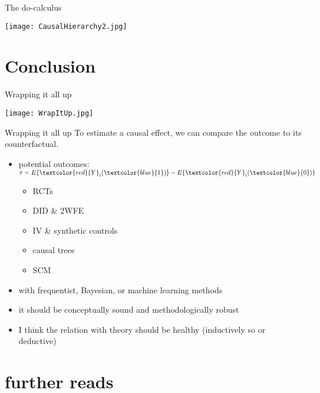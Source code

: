 \documentclass[aspectratio=169]{beamer}
\begin{document}
		\begin{frame}{The do-calculus}
			\begin{center}
				\texttt{[image: CausalHierarchy2.jpg]}
			\end{center}
		\end{frame}

\section{Conclusion}


	\begin{frame}{Wrapping it all up}
		\begin{center}
			\texttt{[image: WrapItUp.jpg]}
		\end{center}
	\end{frame}

	\begin{frame}{Wrapping it all up}
		To estimate a causal effect, we can compare the outcome to its counterfactual.
		\begin{itemize}
			\item<1-> potential outcomes: $ \tau  =  E \{\textcolor{red}{Y}_i(\textcolor{blue}{1})\} - E \{\textcolor{red}{Y}_i(\textcolor{blue}{0})\} $
			\begin{itemize}
				\item<2-> RCTs
				\item<2-> DID \& 2WFE
				\item<2-> IV \& synthetic controls
				\item<2-> causal trees
				\item<2->	SCM
			\end{itemize}
			\item<3-> with frequentist, Bayesian, or machine learning methods
			\item<4-> it should be conceptually sound and methodologically robust
			\item<5> I think the relation with theory should be healthy (inductively so or deductive)
		\end{itemize}
	\end{frame}

\section{further reads}
\end{document}
